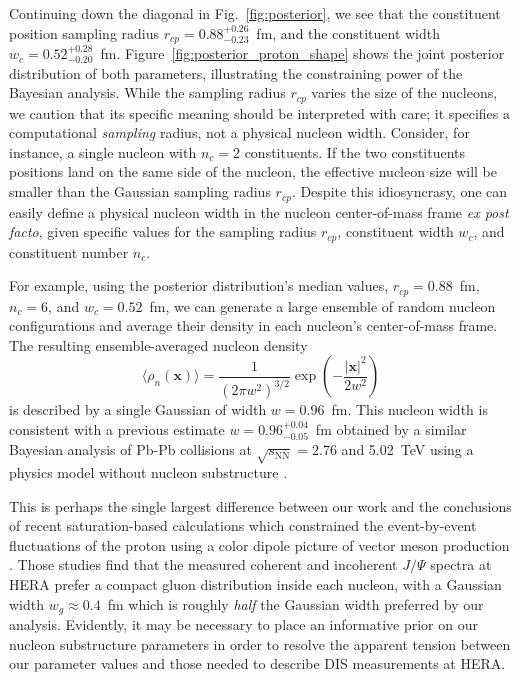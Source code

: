 \documentclass[aps,prc,reprint,amsmath,nofootinbib]{revtex4-1}
\newcommand{\sqrts}{\sqrt{s_\mathrm{NN}}}
\newcommand{\rc}{r_{cp}}
\newcommand{\nc}{n_c}
\newcommand{\wc}{w_c}
\newcommand{\xv}{\mathbf x}
\begin{document}
Continuing down the diagonal in Fig.~\ref{fig:posterior}, we see that the constituent position sampling radius $\rc=0.88_{-0.23}^{+0.26}$~fm, and the constituent width $\wc=0.52_{-0.20}^{+0.28}$~fm.
Figure~\ref{fig:posterior_proton_shape} shows the joint posterior distribution of both parameters, illustrating the constraining power of the Bayesian analysis.
While the sampling radius $\rc$ varies the size of the nucleons, we caution that its specific meaning should be interpreted with care; it specifies a computational \emph{sampling} radius, not a physical nucleon width.
Consider, for instance, a single nucleon with $\nc = 2$ constituents.
If the two constituents positions land on the same side of the nucleon, the effective nucleon size will be smaller than the Gaussian sampling radius $\rc$.
Despite this idiosyncrasy, one can easily define a physical nucleon width in the nucleon center-of-mass frame \emph{ex post facto}, given specific values for the sampling radius $\rc$, constituent width $\wc$, and constituent number $\nc$.

For example, using the posterior distribution's median values, $\rc=0.88$~fm, $\nc=6$, and $\wc=0.52$~fm, we can generate a large ensemble of random nucleon configurations and average their density in each nucleon's center-of-mass frame.
The resulting ensemble-averaged nucleon density
\begin{equation}
  \langle \rho_n(\xv)\rangle = \frac{1}{(2 \pi w^2)^{3/2}} \exp \left( -\frac{|\xv|^2}{2 w^2} \right)
\end{equation}
is described by a single Gaussian of width $w = 0.96$~fm.
This nucleon width is consistent with a previous estimate $w = 0.96_{-0.05}^{+0.04}$~fm obtained by a similar Bayesian analysis of Pb-Pb collisions at $\sqrts=2.76$ and 5.02~TeV using a physics model without nucleon substructure \cite{Bernhard:2018hnz}.

This is perhaps the single largest difference between our work and the conclusions of recent saturation-based calculations which constrained the event-by-event fluctuations of the proton using a color dipole picture of vector meson production \cite{Mantysaari:2016ykx, Mantysaari:2016jaz}.
Those studies find that the measured coherent and incoherent $J/\Psi$ spectra at HERA prefer a compact gluon distribution inside each nucleon, with a Gaussian width $w_g \approx 0.4$~fm which is roughly \emph{half} the Gaussian width preferred by our analysis.
Evidently, it may be necessary to place an informative prior on our nucleon substructure parameters in order to resolve the apparent tension between our parameter values and those needed to describe DIS measurements at HERA.
\end{document}
